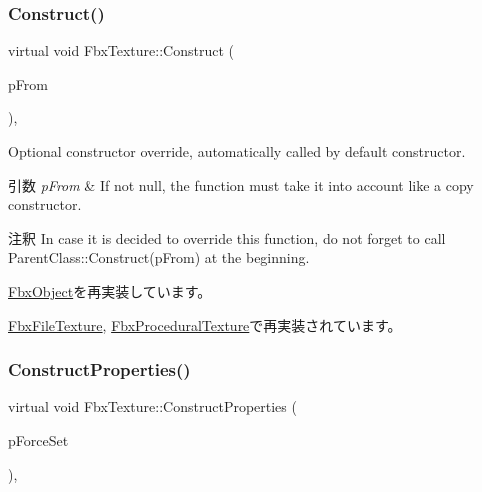 \subsubsection{\texorpdfstring{Construct()}{Construct()}}
{\footnotesize\ttfamily virtual void Fbx\+Texture\+::\+Construct (\begin{DoxyParamCaption}\item[{const \hyperlink{class_fbx_object}{Fbx\+Object} $\ast$}]{p\+From }\end{DoxyParamCaption})\hspace{0.3cm}{\ttfamily [protected]}, {\ttfamily [virtual]}}

Optional constructor override, automatically called by default constructor. 
\begin{DoxyParams}{引数}
{\em p\+From} & If not null, the function must take it into account like a copy constructor. \\
\hline
\end{DoxyParams}
\begin{DoxyRemark}{注釈}
In case it is decided to override this function, do not forget to call Parent\+Class\+::\+Construct(p\+From) at the beginning. 
\end{DoxyRemark}


\hyperlink{class_fbx_object_a313503bc645af3fdceb4a99ef5cea7eb}{Fbx\+Object}を再実装しています。



\hyperlink{class_fbx_file_texture_a107d1612fc50f17722c77ee8df236eeb}{Fbx\+File\+Texture}, \hyperlink{class_fbx_procedural_texture_a2386483aef2766c16c911e6fd6539d32}{Fbx\+Procedural\+Texture}で再実装されています。

\mbox{\label{class_fbx_texture_a851d5c4c96fb5023c004c88aeab2275b}} 
\subsubsection{\texorpdfstring{Construct\+Properties()}{ConstructProperties()}}
{\footnotesize\ttfamily virtual void Fbx\+Texture\+::\+Construct\+Properties (\begin{DoxyParamCaption}\item[{bool}]{p\+Force\+Set }\end{DoxyParamCaption})\hspace{0.3cm}{\ttfamily [protected]}, {\ttfamily [virtual]}}

